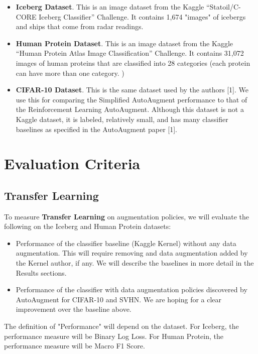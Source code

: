 \documentclass[10pt,twocolumn,letterpaper]{article}
\begin{document}
\begin{itemize}
  \item \textbf{Iceberg Dataset}.  This is an image dataset from the Kaggle “Statoil/C-CORE Iceberg Classifier” Challenge.  It contains 1,674 "images" of icebergs and ships that come from radar readings.  
  \item \textbf{Human Protein Dataset}.  This is an image dataset from the Kaggle “Human Protein Atlas Image Classification” Challenge.   It contains 31,072 images of human proteins that are classified into 28 categories (each protein can have more than one  category. )
  \item \textbf{CIFAR-10 Dataset}.  This is the same dataset used by the authors [1].  We use this for comparing the Simplified AutoAugment performance to that of the Reinforcement Learning AutoAugment.  Although this dataset is not a Kaggle dataset, it is labeled, relatively small, and has many classifier baselines as specified in the AutoAugment paper [1].        
\end{itemize}


\section{Evaluation Criteria}

\subsection{Transfer Learning}

To measure \textbf{Transfer Learning} on augmentation policies, we will evaluate the following on the Iceberg and Human Protein datasets:

\begin{itemize}
  \item Performance of the classifier baseline (Kaggle Kernel) without any data augmentation.  This will require removing and data augmentation added by the Kernel author, if any.  We will describe the baselines in more detail in the Results sections.
  \item Performance of the classifier with data augmentation policies discovered by AutoAugment for CIFAR-10 and SVHN.  We are hoping for a clear improvement over the baseline above.
\end{itemize}

The definition of "Performance" will depend on the dataset.  For Iceberg, the performance measure will be Binary Log Loss.  For Human Protein, the performance measure will be Macro F1 Score.
\end{document}
